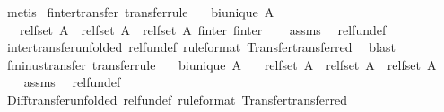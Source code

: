 \begin{isabellebody}
\ metis%
\endisatagproof
{\isafoldproof}%
%
\isadelimproof
\isanewline
%
\endisadelimproof
\isanewline
{}\isamarkupfalse%
\ finter{\isacharunderscore}transfer\ {\isacharbrackleft}transfer{\isacharunderscore}rule{\isacharbrackright}{\isacharcolon}\isanewline
\ \ \ {\isachardoublequoteopen}bi{\isacharunderscore}unique\ A{\isachardoublequoteclose}\isanewline
\ \ \ {\isachardoublequoteopen}{\isacharparenleft}rel{\isacharunderscore}fset\ A\ {\isacharequal}{\isacharequal}{\isacharequal}{\isachargreater}\ rel{\isacharunderscore}fset\ A\ {\isacharequal}{\isacharequal}{\isacharequal}{\isachargreater}\ rel{\isacharunderscore}fset\ A{\isacharparenright}\ finter\ finter{\isachardoublequoteclose}\isanewline
%
\isadelimproof
\ \ %
\endisadelimproof
%
\isatagproof
{}\isamarkupfalse%
\ assms\ \isamarkupfalse%
\ rel{\isacharunderscore}fun{\isacharunderscore}def\isanewline
\ \ \isamarkupfalse%
\ inter{\isacharunderscore}transfer{\isacharbrackleft}unfolded\ rel{\isacharunderscore}fun{\isacharunderscore}def{\isacharcomma}\ rule{\isacharunderscore}format{\isacharcomma}\ Transfer{\isachardot}transferred{\isacharbrackright}\ \isamarkupfalse%
\ blast%
\endisatagproof
{\isafoldproof}%
%
\isadelimproof
\isanewline
%
\endisadelimproof
\isanewline
{}\isamarkupfalse%
\ fminus{\isacharunderscore}transfer\ {\isacharbrackleft}transfer{\isacharunderscore}rule{\isacharbrackright}{\isacharcolon}\isanewline
\ \ \ {\isachardoublequoteopen}bi{\isacharunderscore}unique\ A{\isachardoublequoteclose}\isanewline
\ \ \ {\isachardoublequoteopen}{\isacharparenleft}rel{\isacharunderscore}fset\ A\ {\isacharequal}{\isacharequal}{\isacharequal}{\isachargreater}\ rel{\isacharunderscore}fset\ A\ {\isacharequal}{\isacharequal}{\isacharequal}{\isachargreater}\ rel{\isacharunderscore}fset\ A{\isacharparenright}\ {\isacharparenleft}{\isacharbar}{\isacharminus}{\isacharbar}{\isacharparenright}\ {\isacharparenleft}{\isacharbar}{\isacharminus}{\isacharbar}{\isacharparenright}{\isachardoublequoteclose}\isanewline
%
\isadelimproof
\ \ %
\endisadelimproof
%
\isatagproof
{}\isamarkupfalse%
\ assms\ \isamarkupfalse%
\ rel{\isacharunderscore}fun{\isacharunderscore}def\isanewline
\ \ \isamarkupfalse%
\ Diff{\isacharunderscore}transfer{\isacharbrackleft}unfolded\ rel{\isacharunderscore}fun{\isacharunderscore}def{\isacharcomma}\ rule{\isacharunderscore}format{\isacharcomma}\ Transfer{\isachardot}transferred{\isacharbrackright}\ \isamarkupfalse%

\end{isabellebody}
